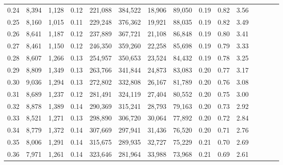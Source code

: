 \begin{tabular}{rrrcrrrrrrrrrrr}
0.24 &   8,394 &   1,128 &                                       0.12 &  221,088 &  384,522 &   18,906 &   89,050 &  0.19 &  0.82 &                         3.56 \\
0.25 &   8,160 &   1,015 &                                       0.11 &  229,248 &  376,362 &   19,921 &   88,035 &  0.19 &  0.82 &                         3.49 \\
0.26 &   8,641 &   1,187 &                                       0.12 &  237,889 &  367,721 &   21,108 &   86,848 &  0.19 &  0.80 &                         3.41 \\
0.27 &   8,461 &   1,150 &                                       0.12 &  246,350 &  359,260 &   22,258 &   85,698 &  0.19 &  0.79 &                         3.33 \\
0.28 &   8,607 &   1,266 &                                       0.13 &  254,957 &  350,653 &   23,524 &   84,432 &  0.19 &  0.78 &                         3.25 \\
0.29 &   8,809 &   1,349 &                                       0.13 &  263,766 &  341,844 &   24,873 &   83,083 &  0.20 &  0.77 &                         3.17 \\
0.30 &   9,036 &   1,294 &                                       0.13 &  272,802 &  332,808 &   26,167 &   81,789 &  0.20 &  0.76 &                         3.08 \\
0.31 &   8,689 &   1,237 &                                       0.12 &  281,491 &  324,119 &   27,404 &   80,552 &  0.20 &  0.75 &                         3.00 \\
0.32 &   8,878 &   1,389 &                                       0.14 &  290,369 &  315,241 &   28,793 &   79,163 &  0.20 &  0.73 &                         2.92 \\
0.33 &   8,521 &   1,271 &                                       0.13 &  298,890 &  306,720 &   30,064 &   77,892 &  0.20 &  0.72 &                         2.84 \\
0.34 &   8,779 &   1,372 &                                       0.14 &  307,669 &  297,941 &   31,436 &   76,520 &  0.20 &  0.71 &                         2.76 \\
0.35 &   8,006 &   1,291 &                                       0.14 &  315,675 &  289,935 &   32,727 &   75,229 &  0.21 &  0.70 &                         2.69 \\
0.36 &   7,971 &   1,261 &                                       0.14 &  323,646 &  281,964 &   33,988 &   73,968 &  0.21 &  0.69 &                         2.61 \\

\end{tabular}
